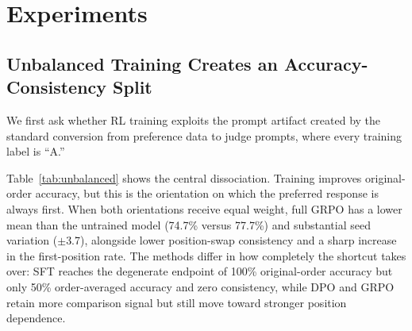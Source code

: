 \documentclass[11pt]{article}
\begin{document}
\section{Experiments}

\subsection{Unbalanced Training Creates an Accuracy-Consistency Split}

We first ask whether RL training exploits the prompt artifact created by the standard conversion from preference data to judge prompts, where every training label is ``A.''

Table~\ref{tab:unbalanced} shows the central dissociation. Training improves original-order accuracy, but this is the orientation on which the preferred response is always first. When both orientations receive equal weight, full GRPO has a lower mean than the untrained model (74.7\% versus 77.7\%) and substantial seed variation ($\pm$3.7), alongside lower position-swap consistency and a sharp increase in the first-position rate. The methods differ in how completely the shortcut takes over: SFT reaches the degenerate endpoint of 100\% original-order accuracy but only 50\% order-averaged accuracy and zero consistency, while DPO and GRPO retain more comparison signal but still move toward stronger position dependence.
\end{document}
